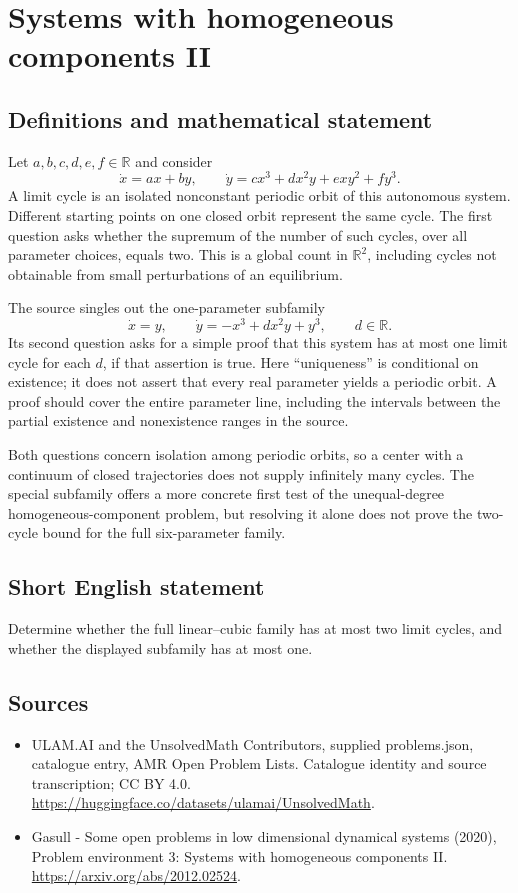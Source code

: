 \documentclass[11pt,a4paper]{article}
\begin{document}
\section*{Systems with homogeneous components II}\label{statement}

\subsection{Definitions and mathematical statement}
Let $a,b,c,d,e,f\in\mathbb R$ and consider
\[
 \dot x=ax+by,\qquad
 \dot y=cx^3+dx^2y+exy^2+fy^3.
\]
A limit cycle is an isolated nonconstant periodic orbit of this autonomous
system. Different starting points on one closed orbit represent the same
cycle. The first question asks whether the supremum of the number of such
cycles, over all parameter choices, equals two. This is a global count in
$\mathbb R^2$, including cycles not obtainable from small perturbations of
an equilibrium.

The source singles out the one-parameter subfamily
\[
 \dot x=y,\qquad \dot y=-x^3+dx^2y+y^3,
 \qquad d\in\mathbb R.
\]
Its second question asks for a simple proof that this system has at most one
limit cycle for each $d$, if that assertion is true. Here ``uniqueness'' is
conditional on existence; it does not assert that every real parameter yields
a periodic orbit. A proof should cover the entire parameter line, including
the intervals between the partial existence and nonexistence ranges in the
source.

Both questions concern isolation among periodic orbits, so a center with a
continuum of closed trajectories does not supply infinitely many cycles.
The special subfamily offers a more concrete first test of the unequal-degree
homogeneous-component problem, but resolving it alone does not prove the
two-cycle bound for the full six-parameter family.
\subsection{Short English statement}
Determine whether the full linear–cubic family has at most two limit cycles, and whether the displayed subfamily has at most one.
\subsection{Sources}
\begin{itemize}
\item[S1] ULAM.AI and the UnsolvedMath Contributors, supplied problems.json, catalogue entry, AMR Open Problem Lists. Catalogue identity and source transcription; CC BY 4.0.
\url{https://huggingface.co/datasets/ulamai/UnsolvedMath}.
\item[S2] Gasull - Some open problems in low dimensional dynamical systems (2020), Problem environment 3: Systems with homogeneous components II. 
\url{https://arxiv.org/abs/2012.02524}.
\end{itemize}
\end{document}
